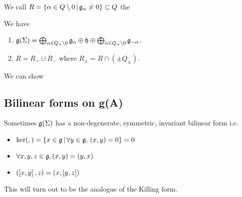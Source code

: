 \documentclass{article}
\begin{document}
\begin{definition}
We call $R = \pbrace{\alpha \in Q \setminus 0 \, | \, \mf{g}_\alpha \neq 0} \subset Q$ the 
\end{definition}

\begin{prop}
 We have
\begin{enumerate}
    \item $\mf{g}(\Sigma) = \bigoplus_{\alpha \in Q_+ \setminus 0} \mf{g}_\alpha \oplus \mf{h} \oplus \bigoplus_{\alpha \in Q_+ \setminus 0} \mf{g}_{-\alpha}$. 
    \item $R = R_+ \cup R_-$ where $R_\pm = R \cap (\pm Q_\pm)$. 
\end{enumerate}
\end{prop}

\begin{ex}
We can show 
\end{ex}

\subsection{Bilinear forms on g(A)}

Sometimes $\mf{g}(\Sigma)$ has a non-degenerate, symmetric, invariant bilinear form 
i.e. 
\begin{itemize}
    \item $\ker(,) = \pbrace{x \in \mf{g} \, | \, \forall y \in \mf{g}, \, (x,y) =0} = 0$
    \item $\forall x,y,z \in \mf{g}, (x,y) = (y,x)$
    \item $(\comm[x]{y},z) = (x,\comm[y]{z})$
\end{itemize}

This will turn out to be the analogue of the Killing form. 
\end{document}
